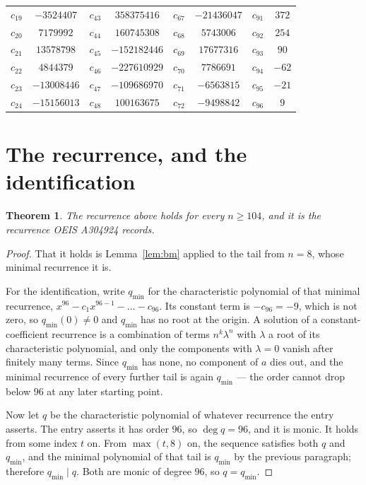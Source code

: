 \documentclass[11pt,a4paper]{article}
\theoremstyle{plain}
\newtheorem{theorem}{Theorem}
\theoremstyle{definition}
\begin{document}
\begin{center}
\begin{tabular}{cccccccc}
$c_{19}$ & $-3524407$ & $c_{43}$ & $358375416$ & $c_{67}$ & $-21436047$ & $c_{91}$ & $372$ \\
$c_{20}$ & $7179992$ & $c_{44}$ & $160745308$ & $c_{68}$ & $5743006$ & $c_{92}$ & $254$ \\
$c_{21}$ & $13578798$ & $c_{45}$ & $-152182446$ & $c_{69}$ & $17677316$ & $c_{93}$ & $90$ \\
$c_{22}$ & $4844379$ & $c_{46}$ & $-227610929$ & $c_{70}$ & $7786691$ & $c_{94}$ & $-62$ \\
$c_{23}$ & $-13008446$ & $c_{47}$ & $-109686970$ & $c_{71}$ & $-6563815$ & $c_{95}$ & $-21$ \\
$c_{24}$ & $-15156013$ & $c_{48}$ & $100163675$ & $c_{72}$ & $-9498842$ & $c_{96}$ & $9$ \\
\end{tabular}
\end{center}

\section{The recurrence, and the identification}

\begin{theorem}
The recurrence above holds for every $n\ge104$, and it is the recurrence OEIS A304924 records.
\end{theorem}

\begin{proof}
That it holds is Lemma~\ref{lem:bm} applied to the tail from $n=8$, whose minimal
recurrence it is.

For the identification, write $q_{\min}$ for the characteristic polynomial of that minimal
recurrence, $x^{96}-c_1x^{96-1}-\dots-c_{96}$. Its constant term is
$-c_{96}=-9$, which is not zero, so $q_{\min}(0)\neq0$ and $q_{\min}$ has no
root at the origin. A solution of a constant-coefficient recurrence is a combination of terms
$n^{k}\lambda^{n}$ with $\lambda$ a root of its characteristic polynomial, and only the
components with $\lambda=0$ vanish after finitely many terms. Since $q_{\min}$ has none, no
component of $a$ dies out, and the minimal recurrence of every further tail is again
$q_{\min}$ --- the order cannot drop below $96$ at any later starting point.

Now let $q$ be the characteristic polynomial of whatever recurrence the entry asserts. The
entry asserts it has order $96$, so $\deg q=96$, and it is monic. It holds from some
index $t$ on. From $\max(t,8)$ on, the sequence satisfies both $q$ and $q_{\min}$, and
the minimal polynomial of that tail is $q_{\min}$ by the previous paragraph; therefore
$q_{\min}\mid q$. Both are monic of degree $96$, so $q=q_{\min}$.
\end{proof}
\end{document}
